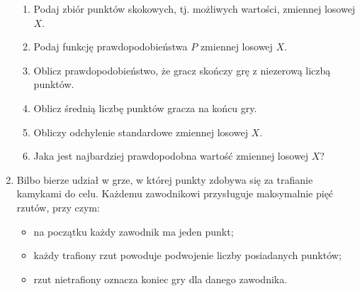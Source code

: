 \documentclass[twoside]{mwart}
\newcommand{\ans}[1]{}
\newcommand{\ans}[1]{\par\emph{Odpowiedź:} #1}
\begin{document}
\begin{enumerate}
\begin{enumerate}
\item Podaj zbiór punktów skokowych, tj. możliwych wartości, zmiennej losowej $X$.
\ans{$\{0, 2, 4, \ldots, 2^{n}, \ldots\}=\{0\}\cup\{2^n\colon n\in\mathbb{N}_{+} \}$}
\item Podaj funkcję prawdopodobieństwa $P$ zmiennej losowej $X$.
\ans{
\[
P(X=k)=\begin{cases} 
\left(\frac{1}{3}\right)^{n-1}\frac{1}{2} & k=2^n\, n\in\mathbb{N}_{+} \\
\frac{1}{4} & k=0\quad \text{(wyprowadzenie niżej)}
\end{cases} \]
}
\item Oblicz prawdopodobieństwo, że gracz skończy grę z niezerową liczbą punktów.
\ans{\[P(X>0)=\sum_{n=1}^\infty \left(\frac{1}{3}\right)^{n-1}\frac{1}{2}=
\frac{1}{2}\sum_{n=0}^\infty \left(\frac{1}{3}\right)^n = \frac{1}{2}\cdot \frac{1}{1-\frac{1}{3}}=\frac{3}{4} \]}
\item Oblicz średnią liczbę punktów gracza na końcu gry.
\ans{\[
EX = \sum_{n=1}^\infty 2^{n}\left(\frac{1}{3}\right)^{n-1}\frac{1}{2} = \sum_{n=1}^\infty \left(\frac{2}{3}\right)^{n-1} = \sum_{n=0}^\infty \left(\frac{2}{3}\right)^n = \frac{1}{1-\frac{2}{3}} = 3
\]}
\item Obliczy odchylenie standardowe zmiennej losowej $X$.
\ans{$DX=\sqrt{E(X^2)-(EX)^2}$ \\
\[
EX^2=\sum_{n=1}^\infty \left(2^{n}\right)^2\left(\frac{1}{3}\right)^{n-1}\frac{1}{2} =
\frac{1}{2} \sum_{n=1}^\infty 4^{n}\left(\frac{1}{3}\right)^{n-1} =
\frac{4}{2} \sum_{n=1}^\infty 4^{n-1}\left(\frac{1}{3}\right)^{n-1} =
\frac{1}{2} \sum_{n=0}^\infty \left(\frac{4}{3}\right)^n \to\infty
\]
Wyciągamy z tego wniosek, że nie można obliczyć odchylenia standardowego tej zmiennej losowej.
}
\item Jaka jest najbardziej prawdopodobna wartość zmiennej losowej $X$?
\ans{2}
\end{enumerate}
\item Bilbo bierze udział w grze, w której punkty zdobywa się za trafianie kamykami do celu. Każdemu zawodnikowi przysługuje maksymalnie pięć rzutów, przy czym:
\begin{itemize}
\item na początku każdy zawodnik ma jeden punkt;
\item każdy trafiony rzut powoduje podwojenie liczby posiadanych punktów;
\item rzut nietrafiony oznacza koniec gry dla danego zawodnika.
\end{itemize}

\end{enumerate}
\end{document}

